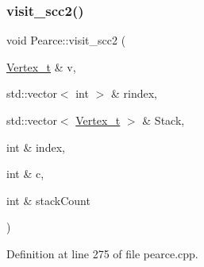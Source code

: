 \subsubsection{\texorpdfstring{visit\+\_\+scc2()}{visit\_scc2()}}
{\footnotesize\ttfamily void Pearce\+::visit\+\_\+scc2 (\begin{DoxyParamCaption}\item[{\hyperlink{class_graph_component_ae67114a6ce5a001dc35e1996e1b45aa0}{Vertex\+\_\+t} \&}]{v,  }\item[{std\+::vector$<$ int $>$ \&}]{rindex,  }\item[{std\+::vector$<$ \hyperlink{class_graph_component_ae67114a6ce5a001dc35e1996e1b45aa0}{Vertex\+\_\+t} $>$ \&}]{Stack,  }\item[{int \&}]{index,  }\item[{int \&}]{c,  }\item[{int \&}]{stack\+Count }\end{DoxyParamCaption})}



Definition at line 275 of file pearce.\+cpp.


